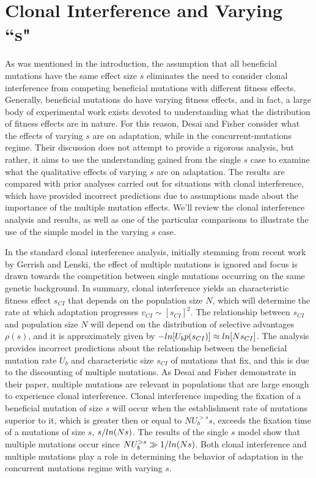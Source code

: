 \documentclass[12pt, one column]{article}
\begin{document}
\section*{Clonal Interference and Varying ``s"}
As was mentioned in the introduction, the assumption that all beneficial mutations have the same effect size $s$ eliminates the need to consider clonal interference from competing beneficial mutations with different fitness effects.  Generally, beneficial mutations do have varying fitness effects, and in fact, a large body of experimental work exists devoted to understanding what the distribution of fitness effects are in nature.  For this reason, Desai and Fisher consider what the effects of varying $s$ are on adaptation, while in the concurrent-mutations regime.  Their discussion does not attempt to provide a rigorous analysis, but rather, it aims to use the understanding gained from the single $s$ case to examine what the qualitative effects of varying $s$ are on adaptation.  The results are compared with prior analyses carried out for situations with clonal interference, which have provided incorrect predictions due to assumptions made about the importance of the multiple mutation effects.  We'll review the clonal interference analysis and results, as well as one of the particular comparisons to illustrate the use of the simple model in the varying $s$ case.

In the standard clonal interference analysis, initially stemming from recent work by Gerrish and Lenski, the effect of multiple mutations is ignored and focus is drawn towards the competition between single mutations occurring on the same genetic background.  In summary, clonal interference yields an characteristic fitness effect $s_{CI}$ that depends on the population size $N$, which will determine the rate at which adaptation progresses $v_{CI} \sim [s_{CI}]^2$.  The relationship between $s_{CI}$ and population size $N$ will depend on the distribution of selective advantages $\rho(s)$, and it is approximately given by $-\\ln[U_b p(s_{CI})] \approx \\ln[N s_{CI}]$.  The analysis provides incorrect predictions about the relationship between the beneficial mutation rate $U_b$ and characteristic size $s_{CI}$ of mutations that fix, and this is due to the discounting of multiple mutations.  As Desai and Fisher demonstrate in their paper, multiple mutations are relevant in populations that are large enough to experience clonal interference.  Clonal interference impeding the fixation of a beneficial mutation of size $s$ will occur when the establishment rate of mutations superior to it, which is greater then or equal to $NU_b^{>s}s$, exceeds the fixation time of a mutations of size $s$, $s/\\ln(Ns)$.  The results of the single $s$ model show that multiple mutations occur since $NU_b^{>s} \gg 1/\\ln(Ns)$.  Both clonal interference and multiple mutations play a role in determining the behavior of adaptation in the concurrent mutations regime with varying $s$.
\end{document}
